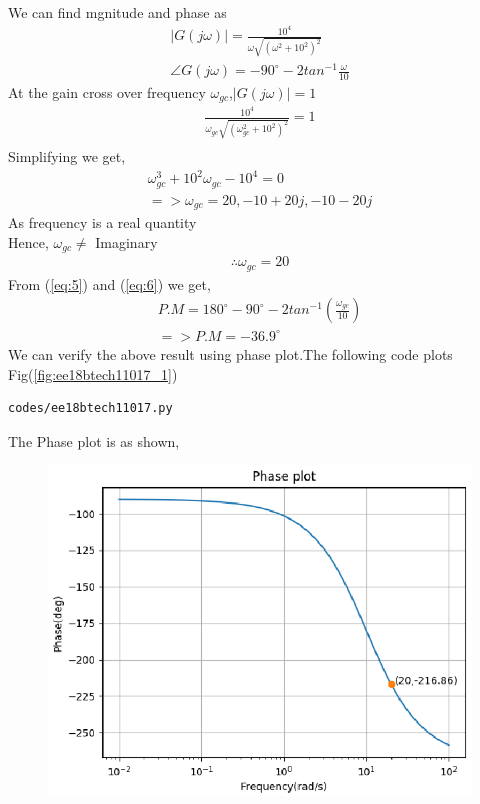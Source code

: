 \begin{enumerate}[label=\thesection.\arabic*.,ref=\thesection.\theenumi]
\begin{align}
\label{eq:3} 
\end{align}
We can find mgnitude and phase as \\
\begin{align}
|G(j\omega)|=\frac{10^{4}}{\omega \sqrt{(\omega^{2}+10^{2})^{2}}} \\
\angle G(j\omega)=-90^{\circ}-2tan^{-1}\frac{\omega}{10} \label{eq:5} 
\end{align}
At the gain cross over frequency $\omega_{gc}$,$|G(j\omega)|=1$
\\
\begin{align}
\frac{10^{4}}{\omega_{gc} \sqrt{(\omega_{gc}^{2}+10^{2})^{2}}}=1 \\
\end{align}
Simplifying we get,
\begin{align}
\omega_{gc}^{3}+10^{2}\omega_{gc}-10^{4}=0 \\
=> \omega_{gc}=20,-10+20j,-10-20j
\end{align}
As frequency is a real quantity
\\Hence, $\omega_{gc} \neq$ Imaginary
\begin{align}
\therefore  \omega_{gc} =20   \label{eq:6} 
\end{align}
From (\ref{eq:5}) and (\ref{eq:6}) we get,
\begin{align}
P.M=180^{\circ}-90^{\circ}-2tan^{-1}(\frac{\omega_{gc}}{10}) \\
=> P.M=-36.9^{\circ}
\end{align}
We can verify the above result using phase plot.The following code plots Fig(\ref{fig:ee18btech11017_1})
\begin{lstlisting}
codes/ee18btech11017.py
\end{lstlisting}
The Phase plot is as shown,
\begin{figure}[!h]
  \includegraphics[width=\columnwidth]{./figures/ee18btech11017_1.eps}

\end{figure}
\end{enumerate}
